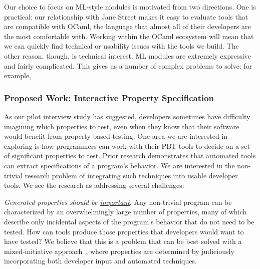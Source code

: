 Our choice to focus on ML-style modules is motivated from two directions. One is
practical: our relationship with Jane Street makes it easy to evaluate tools
that are compatible with OCaml, the language that almost all of their developers
are the most comfortable with. Working within the OCaml ecosystem will mean that
we can quickly find technical or usability issues with the tools we build. The
other reason, though, is technical interest. ML modules are extremely
expressive and fairly complicated. This gives us a number of complex problems to
solve: for example, 


\subsubsection{Proposed Work: Interactive Property Specification}

 

As our pilot interview study has suggested, developers sometimes have
difficulty imagining which properties to test, even when they know that their
software would benefit from property-based testing. One area we are interested
in exploring is how programmers can work with their PBT tools to decide on a set
of significant properties to test.  Prior research demonstrates that automated
tools can extract specifications of a program's
behavior\cite{ammons2002mining,le2018deep,claessen2010quickspec}. We are
interested in the non-trivial research problem of integrating such techniques
into usable developer tools. We see the research as addressing several
challenges:

\textit{Generated properties should be \underline{important}}. Any non-trivial
program can be characterized by an overwhelmingly large number of properties,
many of which describe only incidental aspects of the program's behavior that do
not need to be tested. How can tools produce those properties that developers
would want to have tested? We believe that this is a problem that can be best
solved with a mixed-initiative approach~\cite{allen1999mixed}, where properties
are determined by judiciously incorporating both developer input and automated
techniques.


